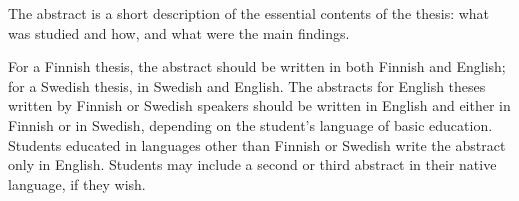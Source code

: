 \documentclass[finnish, 12pt, a4paper, elec, utf8, a-2b, online]{aaltothesis}
\begin{document}

\newpage
\date{21 September 2023}
\begin{abstractpage}[english]
The abstract is a short description of the essential contents of the thesis: 
what was studied and how, and what were the main findings.

For a Finnish thesis, the abstract should be written in both Finnish and 
English; for a Swedish thesis, in Swedish and English. The abstracts for 
English theses written by Finnish or Swedish speakers should be written in 
English and either in Finnish or in Swedish, depending on the student’s language 
of basic education. Students educated in languages other than Finnish or Swedish 
write the abstract only in English. Students may include a second or third 
abstract in their native language, if they wish.
\end{abstractpage}
\end{document}
